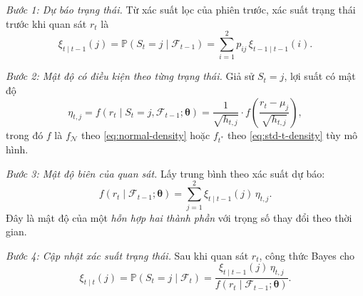 \documentclass[12pt,a4paper]{article}
\numberwithin{equation}{section}
\theoremstyle{definition}
\newcommand{\Prob}{\mathbb{P}}
\newcommand{\Info}{\mathcal{F}}
\newcommand{\Param}{\symbf{\theta}}
\begin{document}
	\emph{Bước 1: Dự báo trạng thái.} Từ xác suất lọc của phiên trước, xác suất trạng thái
	trước khi quan sát $r_t$ là
	\begin{equation}
		\xi_{t\mid t-1}(j)=\Prob\!\left(S_t=j\mid\Info_{t-1}\right)
		=\sum_{i=1}^{2}p_{ij}\,\xi_{t-1\mid t-1}(i).
		\label{eq:predicted-state-prob}
	\end{equation}
	
	\emph{Bước 2: Mật độ có điều kiện theo từng trạng thái.} Giả sử $S_t=j$, lợi suất có
	mật độ
	\begin{equation}
		\eta_{t,j} = f\!\left(r_t \mid S_t=j, \Info_{t-1}; \Param \right)
		= \frac{1}{\sqrt{h_{t,j}}} \cdot f\!\left( \frac{r_t-\mu_j}{\sqrt{h_{t,j}}} \right),
		\label{eq:state-density}
	\end{equation}
	trong đó $f$ là $f_{\mathcal{N}}$ theo \eqref{eq:normal-density} hoặc $f_{t^{*}}$ theo
	\eqref{eq:std-t-density} tùy mô hình.
	
	\emph{Bước 3: Mật độ biên của quan sát.} Lấy trung bình theo xác suất dự báo:
	\begin{equation}
		f\!\left(r_t\mid\Info_{t-1};\Param\right)
		=\sum_{j=1}^{2}\xi_{t\mid t-1}(j)\,\eta_{t,j}.
		\label{eq:mixture-density}
	\end{equation}
	Đây là mật độ của một \emph{hỗn hợp hai thành phần} với trọng số thay đổi theo thời gian.
	
	\emph{Bước 4: Cập nhật xác suất trạng thái.} Sau khi quan sát $r_t$, công thức Bayes
	cho
	\begin{equation}
		\xi_{t\mid t}(j)=\Prob\!\left(S_t=j\mid\Info_t\right)
		=\frac{\xi_{t\mid t-1}(j)\,\eta_{t,j}}{f\!\left(r_t\mid\Info_{t-1};\Param\right)}.
		\label{eq:filtered-state-prob}
	\end{equation}
	
\end{document}

